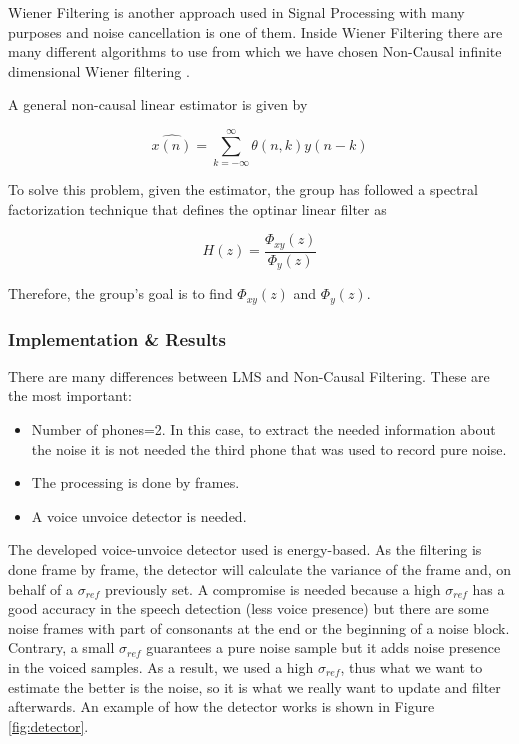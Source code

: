 \documentclass[11pt,a4paper,english]{book}  %
\theoremstyle{definition}  %
\theoremstyle{plain}  %
\theoremstyle{remark}  %
\begin{document}
	
	Wiener Filtering is another approach used in Signal Processing with many purposes and noise cancellation is one of them. Inside Wiener Filtering there are many different algorithms to use from which we have chosen Non-Causal infinite dimensional Wiener filtering \cite{asp}.
	
	A general non-causal linear estimator is given by 
	
	
	\begin{equation}
	\label{eq:nonc1}
		\hat{x(n)} = \sum \limits_{k=-\infty}^\infty \theta(n,k)y(n-k)
	\end{equation}
	
	To solve this problem, given the estimator, the group has followed a spectral factorization technique that defines the optinar linear filter as
	
		\begin{equation}
	\label{eq:nonc1}
		H(z)=\frac{\Phi_{xy}(z)}{\Phi_{y}(z)}
	\end{equation}
	
	Therefore, the group's goal is to find $\Phi_{xy}(z)$ and $\Phi_{y}(z)$.
	
	
	\subsubsection{Implementation \& Results}
	
		There are many differences between LMS and Non-Causal Filtering. These are the most important:
		
		\begin{itemize}
		\item Number of phones=2. In this case, to extract the needed information about the noise it is not needed the third phone that was used to record pure noise.
		
		\item The processing is done by frames.
		
		\item A voice unvoice detector is needed.
		\end{itemize}
		
		The developed voice-unvoice detector used is energy-based. As the filtering is done frame by frame, the detector will calculate the variance of the frame and, on behalf of a $\sigma_{ref}$ previously set. A compromise is needed because a high $\sigma_{ref}$ has a good accuracy in the speech detection (less voice presence) but there are some noise frames with part of consonants at the end or the beginning of a noise block. Contrary, a small $\sigma_{ref}$ guarantees a pure noise sample but it adds noise presence in the voiced samples. As a result, we used a high $\sigma_{ref}$, thus what we want to estimate the better is the noise, so it is what we really want to update and filter afterwards.  An example of how the detector works is shown in Figure \ref{fig:detector}.
		
\end{document}
